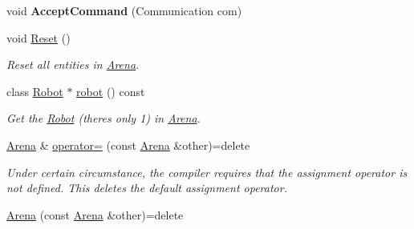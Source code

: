 \begin{DoxyCompactItemize}
\item 
void {\bfseries Accept\+Command} (Communication com)\hypertarget{classArena_a16fac8e4b2399fcf0db01a9722069c33}{}\label{classArena_a16fac8e4b2399fcf0db01a9722069c33}

\item 
void \hyperlink{classArena_a95e295d03a14385f4402a8e839fbae9b}{Reset} ()\hypertarget{classArena_a95e295d03a14385f4402a8e839fbae9b}{}\label{classArena_a95e295d03a14385f4402a8e839fbae9b}

\begin{DoxyCompactList}\small\item\em Reset all entities in \hyperlink{classArena}{Arena}. \end{DoxyCompactList}\item 
class \hyperlink{classRobot}{Robot} $\ast$ \hyperlink{classArena_af9b489317866a4541c6531acb63602c3}{robot} () const 
\begin{DoxyCompactList}\small\item\em Get the \hyperlink{classRobot}{Robot} (there\textquotesingle{}s only 1) in \hyperlink{classArena}{Arena}. \end{DoxyCompactList}\item 
\hyperlink{classArena}{Arena} \& \hyperlink{classArena_aa977a50aa4a5570a2a553705f1909e9b}{operator=} (const \hyperlink{classArena}{Arena} \&other)=delete\hypertarget{classArena_aa977a50aa4a5570a2a553705f1909e9b}{}\label{classArena_aa977a50aa4a5570a2a553705f1909e9b}

\begin{DoxyCompactList}\small\item\em Under certain circumstance, the compiler requires that the assignment operator is not defined. This {\ttfamily deletes} the default assignment operator. \end{DoxyCompactList}\item 
\hyperlink{classArena_afce6e35e1470823539dc9194bef77499}{Arena} (const \hyperlink{classArena}{Arena} \&other)=delete\hypertarget{classArena_afce6e35e1470823539dc9194bef77499}{}\label{classArena_afce6e35e1470823539dc9194bef77499}


\end{DoxyCompactItemize}
